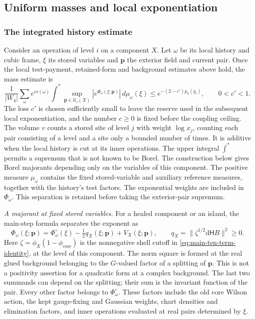 \documentclass[11pt,letterpaper,reqno]{amsart}
\theoremstyle{definition}
\theoremstyle{remark}
\begin{document}
\subsection{Uniform masses and local exponentiation}
\label{sec:mass-exponentiation}

\subsubsection*{The integrated history estimate}
\label{hyp:history-bounds}

Consider an operation of level \(i\) on a component \(X\).
Let \(\omega\) be its local history and cubic frame, \(\xi\) its
stored variables and \(\mathbf p\) the exterior field and current
pair. Once the local test-payment, retained-form and background
estimates above hold, the mass estimate is
\begin{equation}\label{eq:patch-mass}
 \frac1{|W_4|}\sum_\omega e^{cv(\omega)}
 \int^*\sup_{\mathbf p\in\mathcal U_i(X)}
           |e^{\Phi_\omega(\xi;\mathbf p)}|\,d\mu_\omega(\xi)
 \le e^{-(2-c')p_0(g_i)},\qquad 0<c'<1.
\end{equation}
The loss \(c'\) is chosen sufficiently small to leave the reserve used
in the subsequent local exponentiation, and the number \(c\ge0\) is
fixed before the coupling ceiling.
The volume \(v\) counts a stored site of level \(j\) with weight
\(\log x_j\), counting each pair consisting of a level and a site
only a bounded number of times. It is additive when the local
history is cut at its inner operations.
The upper integral \(\int^*\) permits a supremum that is not
known to be Borel. The construction below gives Borel majorants
depending only on the variables of this component.
The positive measure \(\mu_\omega\) contains the fixed
stored-variable and auxiliary reference measures, together with
the history's test factors. The exponential weights are included
in \(\Phi_\omega\). This separation is retained before taking the
exterior-pair supremum.

\emph{A majorant at fixed stored variables.}
For a healed component or an island, the main-step formula separates
the exponent as
\begin{equation}\label{eq:mass-pair-dependence}
 \Phi_\omega(\xi;\mathbf p)
  =\Phi_\omega^\circ(\xi)
      -\tfrac12q_X(\xi;\mathbf p)+V_X(\xi;\mathbf p),
 \qquad q_X=\|\zeta^{1/2}\mathrm d\mathsf H B\|^2\ge0.
\end{equation}
Here \(\zeta=\phi_X(1-\phi_{\mathrm{core}})\) is the
nonnegative shell cutoff in \eqref{eq:main-ten-term-identity},
at the level of this component.
The norm square is formed at the real glued background belonging
to the \(G\)-valued factor of a splitting of \(\mathbf p\).
This is not a positivity assertion for a quadratic form at a
complex background. The last two summands can depend on the
splitting; their sum is the invariant function of the pair.
Every other factor belongs to \(\Phi_\omega^\circ\). These factors
include the old core Wilson action, the kept gauge-fixing and
Gaussian weights, chart densities and elimination factors, and
inner operations evaluated at real pairs determined by \(\xi\).
\end{document}
